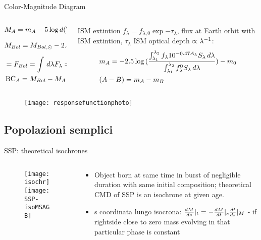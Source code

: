 \begin{frame}{Color-Magnitude Diagram}
\begin{columns}[T]
\begin{column}{0.45\textwidth}
\begin{align*}
&M_A=m_A-5\log{d(\si{\parsec})}+5\\
&M_{Bol}=M_{Bol,\odot}-2.5\log{\frac{4\pi R^2F_{Bol}}{\lsun{}}}\\
&=F_{Bol}=\int\,d\lambda F_{\lambda}=\frac{ac}{4}T_e^4\\
&\BC_A=M_{Bol}-M_A
\end{align*}
\end{column}
\begin{column}{0.55\textwidth}
ISM extintion $f_{\lambda}=f_ {\lambda,0}\exp{-\tau_{\lambda}}$, flux at Earth orbit with ISM extintion, $\tau_{\lambda}$ ISM optical depth $\propto\invers{\lambda}$:
\begin{align*}
&m_A=-2.5\log{(\frac{\int_{\lambda_1}^{\lambda_2}f_{\lambda}10\expy{-0.47A_{\lambda}}S_{\lambda}\,d\lambda}{\int_{\lambda_1}^{\lambda_2}f_{\lambda}^0S_{\lambda}\,d\lambda})}-m_0\\
&(A-B)=m_A-m_B
\end{align*}
\end{column}
\end{columns}
\begin{figure}[!ht]
	\texttt{[image: responsefunctionphoto]}
\end{figure}

\end{frame}

\subsection{Popolazioni semplici}

\begin{frame}{SSP: theoretical isochrones}
\begin{columns}[T]
\begin{column}{0.4\textwidth}
\begin{figure}[!ht]
\texttt{[image: isochr]}
\texttt{[image: SSP-isoMSAGB]}
\end{figure}
\end{column}
\begin{column}{0.6\textwidth}
\begin{itemize}
\item Object born at same time in burst of negligible duration with same initial composition; theoretical CMD of SSP is an isochrone at given age.
\item s coordinata lungo isocrona: $\TDy{s}{M}|_t=-\TDy{t}{M}|_s\TDy{s}{t}|_M$ - if rightside close to zero mass evolving in that particular phase is constant
\end{itemize}
\end{column}
\end{columns}
\end{frame}

